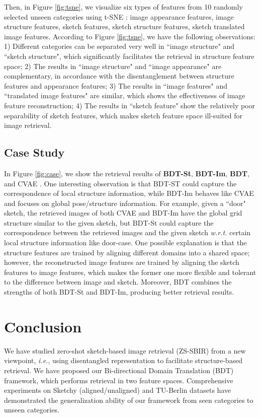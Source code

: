 \documentclass[10pt,twocolumn,letterpaper]{article}
\begin{document}
Then, in Figure \ref{fig:tsne}, we visualize six types of features from 10 randomly selected unseen categories using t-SNE \cite{maaten2008visualizing}: image appearance features, image structure features, sketch features, sketch structure features, sketch translated image features. According to Figure \ref{fig:tsne}, we have the following observations: 1) Different categories can be separated very well in ``image structure" and ``sketch structure", which significantly facilitates the retrieval in structure feature space; 2) The results in ``image structure" and ``image appearance" are complementary, in accordance with the disentanglement between structure features and appearance features; 3) The results in ``image features" and ``translated image features" are similar, which shows the effectiveness of image feature reconstruction; 4) The results in ``sketch feature" show the relatively poor separability of sketch features, which makes sketch feature space ill-suited for image retrieval.

\subsection{Case Study}
In Figure \ref{fig:case}, we show the retrieval results of \textbf{BDT-St}, \textbf{BDT-Im}, \textbf{BDT}, and CVAE \cite{yelamarthi2018zero}. One interesting observation is that BDT-ST could capture the correspondence of local structure information, while BDT-Im behaves like CVAE and focuses on global pose/structure information. For example, given a ``door" sketch, the retrieved images of both CVAE and BDT-Im have the global grid structure similar to the given sketch, but BDT-St could capture the correspondence between the retrieved images and the given sketch \emph{w.r.t.} certain local structure information like door-case.
One possible explanation is that the structure features are trained by aligning different domains into a shared space; however, the reconstructed image features are trained by aligning the sketch features to image features, which makes the former one more flexible and tolerant to the difference between image and sketch. 
Moreover, BDT combines the strengths of both BDT-St and BDT-Im, producing better retrieval results.


\section{Conclusion}
We have studied zero-shot sketch-based image retrieval (ZS-SBIR) from a new viewpoint, \emph{i.e.}, using disentangled representation to facilitate structure-based retrieval. We have proposed our Bi-directional Domain Translation (BDT) framework, which performs retrieval in two feature spaces. Comprehensive experiments on Sketchy (aligned/unaligned) and TU-Berlin datasets have demonstrated the generalization ability of our framework from seen categories to unseen categories.

{\small


}
\end{document}
